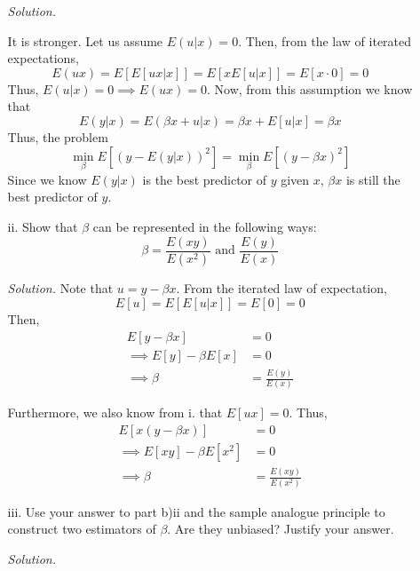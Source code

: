 \documentclass[
]{article}
\begin{document}
\begin{enumerate}
\begin{enumerate}
\textit{Solution.}  

It is stronger. Let us assume $E(u|x) = 0$. Then, from the law of iterated expectations, 
\[E(ux) = E[E[ux|x]] = E[xE[u|x]] = E[x\cdot 0] = 0\]
Thus, $E(u|x) = 0 \implies E(ux) = 0$.  
Now, from this assumption we know that 
$$E(y|x) = E(\beta x + u|x) = \beta x + E[u|x] = \beta x$$
Thus, the problem 
\[\min _ \beta E[(y-E(y|x))^2] = \min _ \beta E[(y- \beta x)^2]\]
Since we know $E(y|x)$ is the best predictor of $y$ given $x$, $\beta x$ is still the best predictor of $y$.  
  
\item[ii.] Show that $\beta$ can be represented in the following ways:
\[\beta = \frac{E(xy)}{E(x^2)} \text{ and } \frac{E(y)}{E(x)}\]  
  
\textit{Solution.} Note that $u = y - \beta x$. From the iterated law of expectation, 
$$E[u] = E[E[u|x]] = E[0] = 0$$
Then, 
\[\begin{aligned} 
E[y - \beta x] &= 0 \\
\implies E[y] - \beta E[x] &= 0 \\
\implies \beta &= \frac{E(y)}{E(x)}
\end{aligned}\]

Furthermore, we also know from i. that $E[ux] = 0$. Thus, 
\[\begin{aligned} 
E[x(y - \beta x)] &= 0 \\
\implies E[xy] - \beta E[x^2] &= 0 \\
\implies \beta &= \frac{E(xy)}{E(x^2)}
\end{aligned}\]

\item[iii.] Use your answer to part b)ii and the sample analogue principle to construct two estimators of $\beta$. Are they unbiased? Justify your answer.  
  
\textit{Solution.}  
  

\end{enumerate}
\end{enumerate}
\end{document}
